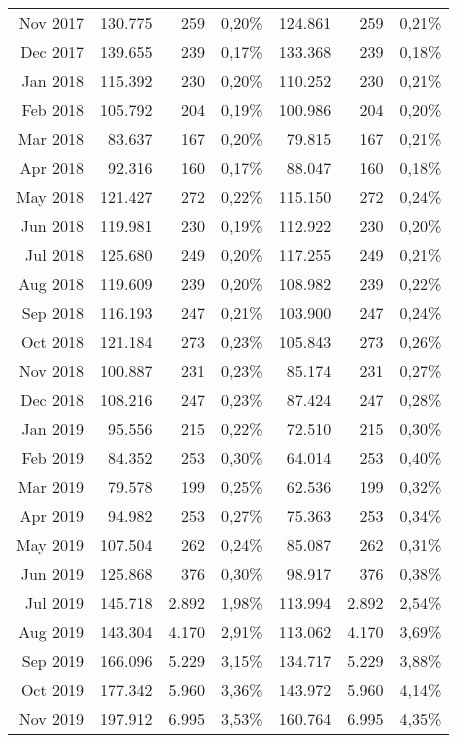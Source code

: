 \begin{longtable}{r|rrr|rrr}
Nov 2017 & 130.775 & 259   & 0,20\% & 124.861 & 259   & 0,21\% \\
Dec 2017 & 139.655 & 239   & 0,17\% & 133.368 & 239   & 0,18\% \\
Jan 2018 & 115.392 & 230   & 0,20\% & 110.252 & 230   & 0,21\% \\
Feb 2018 & 105.792 & 204   & 0,19\% & 100.986 & 204   & 0,20\% \\
Mar 2018 & 83.637  & 167   & 0,20\% & 79.815  & 167   & 0,21\% \\
Apr 2018 & 92.316  & 160   & 0,17\% & 88.047  & 160   & 0,18\% \\
May 2018 & 121.427 & 272   & 0,22\% & 115.150 & 272   & 0,24\% \\
Jun 2018 & 119.981 & 230   & 0,19\% & 112.922 & 230   & 0,20\% \\
Jul 2018 & 125.680 & 249   & 0,20\% & 117.255 & 249   & 0,21\% \\
Aug 2018 & 119.609 & 239   & 0,20\% & 108.982 & 239   & 0,22\% \\
Sep 2018 & 116.193 & 247   & 0,21\% & 103.900 & 247   & 0,24\% \\
Oct 2018 & 121.184 & 273   & 0,23\% & 105.843 & 273   & 0,26\% \\
Nov 2018 & 100.887 & 231   & 0,23\% & 85.174  & 231   & 0,27\% \\
Dec 2018 & 108.216 & 247   & 0,23\% & 87.424  & 247   & 0,28\% \\
Jan 2019 & 95.556  & 215   & 0,22\% & 72.510  & 215   & 0,30\% \\
Feb 2019 & 84.352  & 253   & 0,30\% & 64.014  & 253   & 0,40\% \\
Mar 2019 & 79.578  & 199   & 0,25\% & 62.536  & 199   & 0,32\% \\
Apr 2019 & 94.982  & 253   & 0,27\% & 75.363  & 253   & 0,34\% \\
May 2019 & 107.504 & 262   & 0,24\% & 85.087  & 262   & 0,31\% \\
Jun 2019 & 125.868 & 376   & 0,30\% & 98.917  & 376   & 0,38\% \\
Jul 2019 & 145.718 & 2.892 & 1,98\% & 113.994 & 2.892 & 2,54\% \\
Aug 2019 & 143.304 & 4.170 & 2,91\% & 113.062 & 4.170 & 3,69\% \\
Sep 2019 & 166.096 & 5.229 & 3,15\% & 134.717 & 5.229 & 3,88\% \\
Oct 2019 & 177.342 & 5.960 & 3,36\% & 143.972 & 5.960 & 4,14\% \\
Nov 2019 & 197.912 & 6.995 & 3,53\% & 160.764 & 6.995 & 4,35\% \\

\end{longtable}
